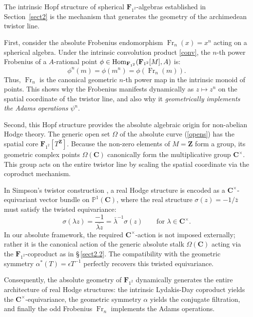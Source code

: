 \documentclass[11pt,a4paper]{article}
\newcommand{\C}{\mathbf{C}}
\newcommand{\Z}{\mathbf{Z}}
\newcommand{\Ftwo}{\mathbf{F}_{1^2}}
\newcommand{\frob}{{\operatorname{Fr}}}
\newcommand{\Hom}{{\rm{Hom}}}
\begin{document}
The intrinsic Hopf structure of spherical $\Ftwo$-algebras established in Section~\ref{sect2} is the  mechanism that generates the geometry of the archimedean twistor line. 

First, consider the absolute Frobenius endomorphism $\frob_n(x) = x^n$ acting on a spherical algebra. Under the intrinsic convolution product \eqref{conv}, the $n$-th power Frobenius of a $A$-rational point $\phi \in \Hom_{\Ftwo}(\Ftwo[M], A)$ is: $$\phi^n(m) = \phi(m^n) = \phi(\frob_n(m)).$$ 
Thus,  $\frob_n$ is the canonical geometric $n$-th power map in the intrinsic monoid of points. This shows why the Frobenius manifests dynamically as $z \mapsto z^n$ on the spatial coordinate of the twistor line, and also why it \emph{geometrically implements the Adams operations} $\psi^n$.\vspace{.03in}

Second,  this Hopf structure provides the absolute algebraic origin for non-abelian Hodge theory. The generic open set $\Omega$ of the absolute curve (\eqref{opens}) has the spatial core $\Ftwo[T^\Z]$. Because the non-zero elements of $M = \Z$ form a group, its geometric complex points $\Omega(\C)$ canonically form the multiplicative group $\C^\times$. This group acts on the entire twistor line by scaling the spatial coordinate via the coproduct mechanism.

In Simpson's twistor construction \cite{Si}, a real Hodge structure is encoded as a \sloppy $\C^\times$-equivariant vector bundle on $\mathbb{P}^1(\C)$, where the real structure $\sigma(z) = -1/\bar{z}$ must satisfy the twisted equivariance:
\begin{equation*}
\sigma(\lambda z) = \frac{-1}{\overline{\lambda z}} = \bar{\lambda}^{-1} \sigma(z) \qquad \text{for } \lambda \in \C^\times.
\end{equation*}
In our absolute framework, the required $\C^\times$-action is not imposed externally; rather it is the canonical action of the generic absolute stalk $\Omega(\C)$ acting via the $\Ftwo$-coproduct as in \S\,\ref{sect2.2}. The compatibility with the geometric symmetry $\alpha^*(T) = \epsilon T^{-1}$ perfectly  recovers this twisted equivariance. 

Consequently, the absolute geometry of $\Ftwo$ dynamically generates the entire architecture of real Hodge structures: the intrinsic Lydakis-Day coproduct yields the $\C^\times$-equivariance, the geometric symmetry $\alpha$ yields the conjugate filtration, and finally  the odd Frobenius $\frob_n$ implements the Adams operations.
\end{document}
